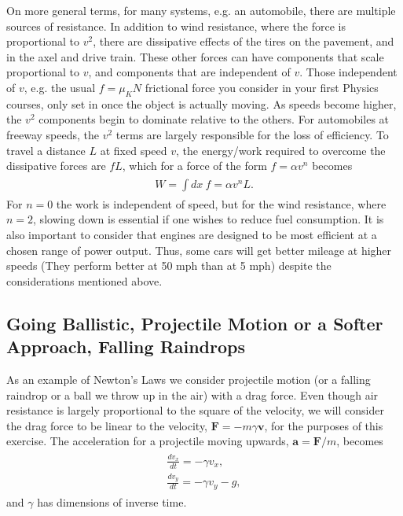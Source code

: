\documentclass[letterpaper,10pt,english]{sphinxmanual}
\begin{document}
On more general terms,
for many systems, e.g. an automobile, there are multiple sources of
resistance. In addition to wind resistance, where the force is
proportional to \(v^2\), there are dissipative effects of the tires on
the pavement, and in the axel and drive train. These other forces can
have components that scale proportional to \(v\), and components that
are independent of \(v\). Those independent of \(v\), e.g. the usual
\(f=\mu_K N\) frictional force you consider in your first Physics courses, only set in
once the object is actually moving. As speeds become higher, the \(v^2\)
components begin to dominate relative to the others. For automobiles
at freeway speeds, the \(v^2\) terms are largely responsible for the
loss of efficiency. To travel a distance \(L\) at fixed speed \(v\), the
energy/work required to overcome the dissipative forces are \(fL\),
which for a force of the form \(f=\alpha v^n\) becomes
\begin{equation*}
\begin{split}
\begin{eqnarray}
W=\int dx~f=\alpha v^n L.
\end{eqnarray}
\end{split}
\end{equation*}
For \(n=0\) the work is
independent of speed, but for the wind resistance, where \(n=2\),
slowing down is essential if one wishes to reduce fuel consumption. It
is also important to consider that engines are designed to be most
efficient at a chosen range of power output. Thus, some cars will get
better mileage at higher speeds (They perform better at 50 mph than at
5 mph) despite the considerations mentioned above.


\subsection{Going Ballistic, Projectile Motion or a Softer Approach, Falling Raindrops}
\label{\detokenize{chapter3:going-ballistic-projectile-motion-or-a-softer-approach-falling-raindrops}}
As an example of Newton’s Laws we consider projectile motion (or a
falling raindrop or a ball we throw up in the air) with a drag force. Even though air resistance is
largely proportional to the square of the velocity, we will consider
the drag force to be linear to the velocity, \(\boldsymbol{F}=-m\gamma\boldsymbol{v}\),
for the purposes of this exercise. The acceleration for a projectile moving upwards,
\(\boldsymbol{a}=\boldsymbol{F}/m\), becomes
\begin{equation*}
\begin{split}
\begin{eqnarray}
\frac{dv_x}{dt}=-\gamma v_x,\\
\nonumber
\frac{dv_y}{dt}=-\gamma v_y-g,
\end{eqnarray}
\end{split}
\end{equation*}
and \(\gamma\) has dimensions of inverse time.
\end{document}

